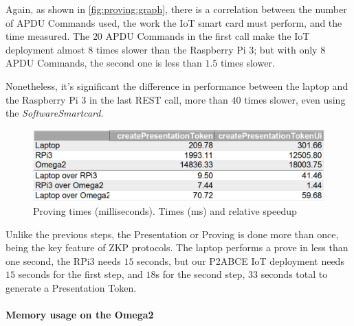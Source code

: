 \documentclass[journal]{IEEEtran}
\begin{document}



Again, as shown in \autoref{fig:proving:graph}, there is a correlation between the number of APDU Commands used, the work the IoT smart card must perform, and the time measured. The $20$ APDU Commands in the first call make the IoT deployment almost $8$ times slower than the Raspberry Pi 3; but with only $8$ APDU Commands, the second one is less than $1.5$ times slower.

Nonetheless, it's significant the difference in performance between the laptop and the Raspberry Pi 3 in the last REST call, more than $40$ times slower, even using the \textit{SoftwareSmartcard}.


\begin{figure}[bth]
	\includegraphics[width=.8\linewidth]{gfx/graphics/provingtable}
	\caption{Proving times (milliseconds). Times (ms) and relative speedup}
	\label{fig:proving:graph}
\end{figure}


Unlike the previous steps, the Presentation or Proving is done more than once, being the key feature of ZKP protocols. The laptop performs a prove in less than one second, the RPi3 needs $15$ seconds, but our P2ABCE IoT deployment needs $15$ seconds for the first step, and $18$s for the second step, $33$ seconds total to generate a Presentation Token.




\hfil

\paragraph{Memory usage on the Omega2}\hfil
\end{document}
